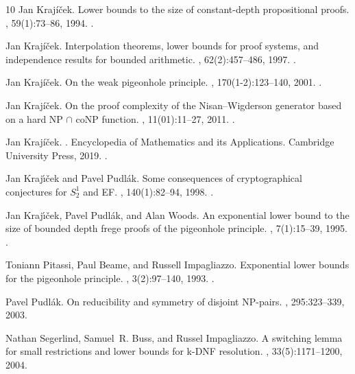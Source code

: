 \begin{thebibliography}{10}
Jan Kraj{\'i}{\v{c}}ek.
\newblock Lower bounds to the size of constant-depth propositional proofs.
, 59(1):73--86, 1994.
\newblock \href {http://dx.doi.org/10.2307/2275250}
  {}.

Jan Kraj{\'i}{\v{c}}ek.
\newblock Interpolation theorems, lower bounds for proof systems, and
  independence results for bounded arithmetic.
, 62(2):457--486, 1997.
\newblock \href {http://dx.doi.org/10.2307/2275541}
  {}.

Jan Kraj{\'i}{\v{c}}ek.
\newblock On the weak pigeonhole principle.
, 170(1-2):123--140, 2001.
\newblock \href {http://dx.doi.org/10.4064/fm170-1-8}
  {}.

Jan Kraj{\'i}{\v{c}}ek.
\newblock On the proof complexity of the {N}isan--{W}igderson generator based
  on a hard {NP} $\cap$ co{NP} function.
, 11(01):11--27, 2011.
\newblock \href {http://dx.doi.org/10.1142/S0219061311000979}
  {}.

Jan Kraj{\'i}{\v{c}}ek.
.
\newblock Encyclopedia of Mathematics and its Applications. Cambridge
  University Press, 2019.
\newblock \href {http://dx.doi.org/10.1017/9781108242066}
  {}.

Jan Kraj\'{\i}\v{c}ek and Pavel Pudl\'{a}k.
\newblock Some consequences of cryptographical conjectures for ${S}_2^1$ and
  {EF}.
, 140(1):82--94, 1998.
\newblock \href {http://dx.doi.org/10.1006/inco.1997.2674}
  {}.

Jan Kraj\'{\i}\v{c}ek, Pavel Pudl\'{a}k, and Alan Woods.
\newblock An exponential lower bound to the size of bounded depth frege proofs
  of the pigeonhole principle.
, 7(1):15--39, 1995.
\newblock \href {http://dx.doi.org/10.1002/rsa.3240070103}
  {}.

Toniann Pitassi, Paul Beame, and Russell Impagliazzo.
\newblock Exponential lower bounds for the pigeonhole principle.
, 3(2):97--140, 1993.
\newblock \href {http://dx.doi.org/10.1007/BF01200117}
  {}.

Pavel Pudl\'ak.
\newblock On reducibility and symmetry of disjoint {NP}-pairs.
, 295:323--339, 2003.

Nathan Segerlind, Samuel~R. Buss, and Russel Impagliazzo.
\newblock A switching lemma for small restrictions and lower bounds for k-{DNF}
  resolution.
, 33(5):1171--1200, 2004.

\end{thebibliography}
